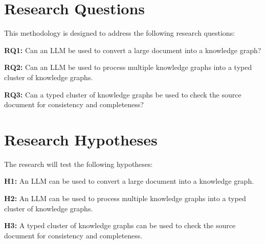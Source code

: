 \section{Research Questions}
This methodology is designed to address the following research questions:

\textbf{RQ1:} Can an LLM be used to convert a large document into a knowledge graph?

\textbf{RQ2:} Can an LLM be used to process multiple knowledge graphs into a typed cluster of knowledge graphs.

\textbf{RQ3:} Can a typed cluster of knowledge graphs be used to check the source document for consistency and completeness?

\section{Research Hypotheses}
The research will test the following hypotheses:

\textbf{H1:} An LLM can be used to convert a large document into a knowledge graph.

\textbf{H2:} An LLM can be used to process multiple knowledge graphs into a typed cluster of knowledge graphs.

\textbf{H3:} A typed cluster of knowledge graphs can be used to check the source document for consistency and completeness.

